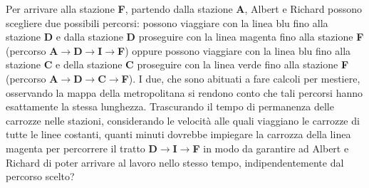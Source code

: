 \documentclass[12pt]{matemaj}
\begin{document}
\vspace{-.8cm}
\quesito[1;24]
Per arrivare alla stazione {\bf F}, partendo dalla stazione {\bf A}, Albert e Richard possono scegliere due possibili percorsi: possono viaggiare con la linea blu fino alla stazione {\bf D} e dalla stazione {\bf D} proseguire con la linea magenta fino alla stazione {\bf F} (percorso {\bf A$\rightarrow$D$\rightarrow$I$\rightarrow$F}) oppure possono viaggiare con la linea blu fino alla stazione {\bf C} e della stazione {\bf C} proseguire con la linea verde fino alla stazione {\bf F} (percorso {\bf A$\rightarrow$D$\rightarrow$C$\rightarrow$F}). I due, che sono abituati a fare calcoli per mestiere, osservando la mappa della metropolitana si rendono conto che tali percorsi hanno esattamente la stessa lunghezza. Trascurando il tempo di permanenza delle carrozze nelle stazioni, considerando le velocità alle quali viaggiano le carrozze di tutte le linee costanti, quanti minuti dovrebbe impiegare la carrozza della linea magenta per percorrere il tratto {\bf D$\rightarrow$I$\rightarrow$F} in modo da garantire ad Albert e Richard di poter arrivare al lavoro nello stesso tempo, indipendentemente dal percorso scelto?
\end{document}
